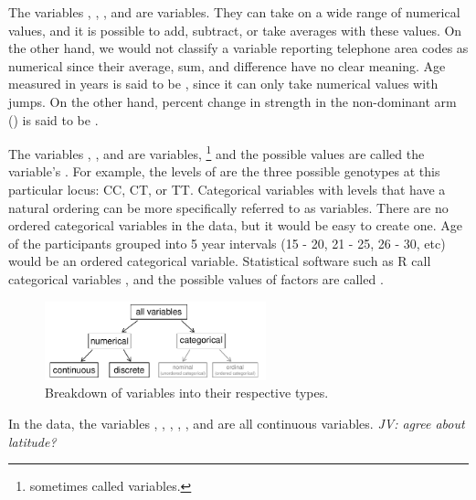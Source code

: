 \begin{doublespace}

The variables , , , and  are  variables. They can take on a wide range of numerical values, and it is possible to add, subtract, or take averages with these values. On the other hand, we would not classify a variable reporting telephone area codes as numerical since their average, sum, and difference have no clear meaning. Age measured in years is said to be , since it can only take numerical values with jumps. On the other hand, percent change in strength in the non-dominant arm () is said to be .

The variables , , and  are  variables, \footnote{sometimes called  variables.} and the possible values are called the variable's . For example, the levels of  are the three possible genotypes at this particular locus: CC, CT, or TT. Categorical variables with levels that have a natural ordering can be more specifically referred to as  variables. There are no ordered categorical variables in the  data, but it would be easy to create one.  Age of the participants grouped into 5 year intervals (15 - 20, 21 - 25, 26 - 30, etc) would be an ordered categorical variable.  Statistical software such as \textsf{R} call categorical variables , and the possible values of factors are called .


\begin{figure}
\centering
\includegraphics[width=0.57\textwidth]{ch_intro_to_data_oi_biostat/figures/variables/variables}
\caption{Breakdown of variables into their respective types.}
\label{variables}
\end{figure}

In the  data, the variables , , , , , and  are all continuous variables.  \textit{JV: agree about latitude?}




\end{doublespace}

